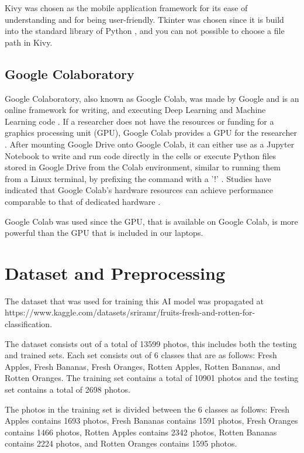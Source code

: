 \documentclass[conference]{IEEEtran}
\begin{document}
Kivy was chosen as the mobile application framework for its ease of understanding and for being user-friendly. Tkinter was chosen since it is build into the standard library of Python \cite{b15}, and you can not possible to choose a file path in Kivy.

\subsection{Google Colaboratory}

Google Colaboratory, also known as Google Colab, was made by Google and is an online framework for writing, and executing Deep Learning and Machine Learning code \cite{b16}. If a researcher does not have the resources or funding for a graphics processing unit (GPU), Google Colab provides a GPU for the researcher \cite{b16}. After mounting Google Drive onto Google Colab, it can either use as a Jupyter Notebook to write and run code directly in the cells or execute Python files stored in Google Drive from the Colab environment, similar to running them from a Linux terminal, by prefixing the command with a '!' \cite{b16}. Studies have indicated that Google Colab's hardware resources can achieve performance comparable to that of dedicated hardware \cite{b17}.

Google Colab was used since the GPU, that is available on Google Colab, is more powerful than the GPU that is included in our laptops.

\section{Dataset and Preprocessing}

The dataset that was used for training this AI model was propagated at https://www.kaggle.com/datasets/sriramr/fruits-fresh-and-rotten-for-classification.

The dataset consists out of a total of 13599 photos, this includes both the testing and trained sets. Each set consists out of 6 classes that are as follows: Fresh Apples, Fresh Bananas, Fresh Oranges, Rotten Apples, Rotten Bananas, and Rotten Oranges. The training set contains a total of 10901 photos and the testing set contains a total of 2698 photos.

The photos in the training set is divided between the 6 classes as follows: Fresh Apples contains 1693 photos, Fresh Bananas contains 1591 photos, Fresh Oranges contains 1466 photos, Rotten Apples contains 2342 photos, Rotten Bananas contains 2224 photos, and Rotten Oranges contains 1595 photos.
\end{document}
